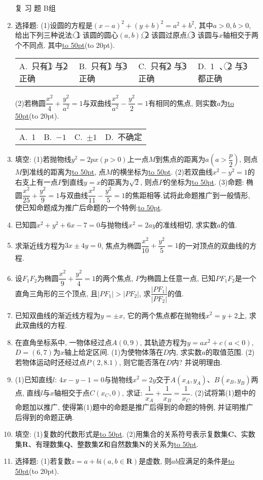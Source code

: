 \documentclass[10pt,a4paper]{article}
\newcommand{\blank}[1]{\underline{\hbox to #1pt{}}}
\newcommand{\bracket}[1]{(\hbox to #1pt{})}
\newcommand{\fourch}[4]{\par\begin{tabular}{p{.23\textwidth}p{.23\textwidth}p{.23\textwidth}p{.23\textwidth}}
A.~#1 &B.~#2& C.~#3& D.~#4
\end{tabular}}
\begin{document}
\begin{enumerate}[1.]
复 习 题
B组
\item 选择题:
(1)设圆的方程是$(x-a)^2+(y+b)^2=a^2+b^2$, 其中$a>0,b>0$, 给出下列三种说法:
\textcircled{1} 该圆的圆心$(a,b)$;
\textcircled{2} 该圆过原点;
\textcircled{3} 该圆与$x$轴相交于两个不同点.
其中\blank{50}\bracket{20}.
\fourch{只有\textcircled{1} 与\textcircled{2} 正确}{只有\textcircled{1} 与\textcircled{3} 正确}{只有\textcircled{2} 与\textcircled{3} 正确}{\textcircled{1} 、\textcircled{2} 与\textcircled{3} 都正确}
(2)若椭圆$\dfrac{x^2}4+\dfrac{y^2}{a^2}=1$与双曲线$\dfrac{x^2}{a^2}-\dfrac{y^2}2=1$有相同的焦点, 则实数$a$为\blank{50}\bracket{20}.
\fourch{1}{$-1$}{$\pm 1$}{不确定}
\item 填空:
(1)若抛物线$y^2=2px(p>0)$上一点$M$到焦点的距离为$a(a>\dfrac p2)$, 则点$M$到准线的距离为\blank{50}, 点$M$的横坐标为\blank{50}.
(2)若双曲线$x^2-y^2=1$的右支上有一点$P$到直线$y=x$的距离为$\sqrt 2$, 则点$P$的坐标为\blank{50}.
(3)命题: 椭圆$\dfrac{x^2}{25}+\dfrac{y^2}9=1$与双曲线$\dfrac{x^2}{11}-\dfrac{y^2}5=1$的焦距相等.试将此命题推广到一般情形, 使已知命题成为推广后命题的一个特例:\blank{50}.
\item 已知圆$x^2+y^2+6x-7=0$与抛物线$x^2=2ay$的准线相切, 求实数$a$的值.
\item 求渐近线方程为$3x\pm 4y=0$, 焦点为椭圆$\dfrac{x^2}{10}+\dfrac{y^2}5=1$的一对顶点的双曲线的方程.
\item 设$F_1F_2$为椭圆$\dfrac{x^2}9+\dfrac{y^2}4=1$的两个焦点, $P$为椭圆上任意一点, 已知$PF_1F_2$是一个直角三角形的三个顶点, 且$|PF_1|>|PF_2|$, 求$\dfrac{|P{F_1}|}{|P{F_2}|}$的值.
\item 已知双曲线的渐近线方程为$y=\pm x$, 它的两个焦点都在抛物线$x^2=y+2$上, 求此双曲线的方程.
\item 在直角坐标系中, 一物体经过点$A(0,9)$, 其轨迹方程为$y=ax^2+c(a<0)$, $D=(6,7)$为$x$轴上给定区间.
(1)为使物体落在$D$内, 求实数$a$的取值范围.
(2)若物体运动时还经过点$P(2,8.1)$, 则它能否落在$D$内? 并说明理由.
\item (1)已知直线$l$: $4x-y-1=0$与抛物线$x^2=2y$交于$A(x_A,y_A)$、$B(x_B,y_B)$两点, 直线$l$与$x$轴相交于点$C(x_C,0)$, 求证: $\dfrac 1{x_A}+\dfrac 1{x_B}=\dfrac 1{x_C}$.
(2)试将第(1)题中的命题加以推广, 使得第(1)题中的命题是推广后得到的命题的特例, 并证明推广后得到的命题正确.
\item 填空:
(1)复数的代数形式是\blank{50}.
(2)用集合的关系符号表示复数集$\mathbf{C}$、实数集$\mathbf{R}$、有理数集$\mathbf{Q}$、整数集$\mathbf{Z}$和自然数集$\mathbf{N}$的关系为\blank{50}.
\item 选择题:
(1)若复数$z=a+b\mathrm{i}(a,b\in \mathbf{R})$是虚数, 则$ab$应满足的条件是\blank{50}\bracket{20}.

\end{enumerate}
\end{document}
